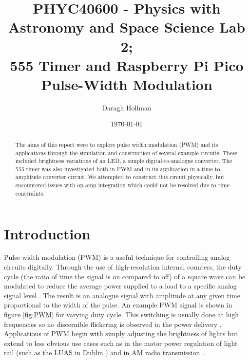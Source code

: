 \documentclass[%
 reprint,
 amsmath,amssymb,
 aps,
]{revtex4-2}
\begin{document}

\title{PHYC40600 - Physics with Astronomy and Space Science Lab 2;\\\vspace{1cm}555 Timer and Raspberry Pi Pico Pulse-Width Modulation}

\author{Daragh Hollman}
%

\date{\today}%

\begin{abstract}
The aims of this report were to explore pulse width modulation (PWM) and its applications through the simulation and construction of several example circuits. These included brightness variations of an LED, a simple digital-to-analogue converter. The 555 timer was also investigated both in PWM and in its application in a time-to-amplitude converter circuit. We attempted to construct this circuit physically, but encountered issues with op-amp integration which could not be resolved due to time constraints.
\end{abstract}

\maketitle

\section{Introduction}

    Pulse width modulation (PWM) is a useful technique for controlling analog circuits digitally. Through the use of high-resolution internal counters, the duty cycle (the ratio of time the signal is on compared to off) of a square wave can be modulated to reduce the average power supplied to a load to a specific analog signal level \cite{barr}. The result is an analogue signal with amplitude at any given time proportional to the width of the pulse. An example PWM signal is shown in figure \ref{fig:PWM} for varying duty cycle. This switching is usually done at high frequencies so no discernible flickering is observed in the power delivery \cite{ucd}.\\

    Applications of PWM begin with simply adjusting the brightness of lights but extend to less obvious use cases such as in the motor power regulation of light rail (such as the LUAS in Dublin \cite{ucd}) and in AM radio transmission \cite{radioworld}.\\
\end{document}
